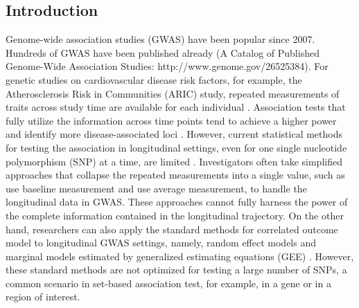 \documentclass[12pt]{article}
\begin{document}
\newpage
\subsection{Introduction}
Genome-wide association studies (GWAS) have been popular since 2007. Hundreds of GWAS have been published already (A Catalog of Published Genome-Wide Association Studies: http://www.genome.gov/26525384). For genetic studies on cardiovascular disease risk factors, for example, the Atherosclerosis Risk in Communities (ARIC) study, repeated measurements of traits across study time are available for each individual \cite{Heiss1989}. Association tests that fully utilize the information across time points tend to achieve a higher power and identify more disease-associated loci \cite{Furlotte2012,Xu2014}. However, current statistical methods for testing the association in longitudinal settings, even for one single nucleotide polymorphism (SNP) at a time, are limited \cite{Fan2012,Furlotte2012}. Investigators often take simplified approaches that collapse the repeated measurements into a single value, such as use baseline measurement and use average measurement, to handle the longitudinal data in GWAS. These approaches cannot fully harness the power of the complete information contained in the longitudinal trajectory. On the other hand, researchers can also apply the standard methods for correlated outcome model to longitudinal GWAS settings, namely, random effect models \cite{laird1982random} and marginal models estimated by generalized estimating equations (GEE) \cite{liang1986longitudinal,zeger1988models}. However, these standard methods are not optimized for testing a large number of SNPs, a common scenario in set-based association test, for example, in a gene or in a region of interest.
\end{document}
